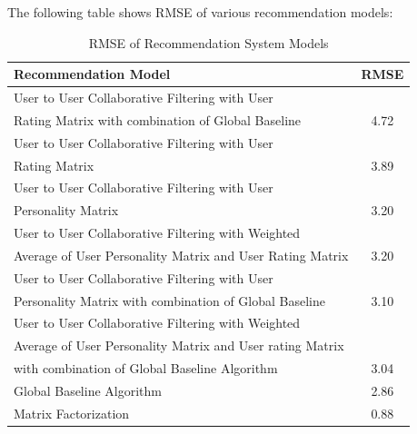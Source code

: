 \documentclass[conference]{IEEEtran}
\begin{document}
The following table shows RMSE of various recommendation models:\\
\FloatBarrier
  \begin{table}[H]
    \centering
        \caption{RMSE of Recommendation System Models}

    \begin{tabular}{| l | c |}
      \hline
      {\bf Recommendation Model} & {\bf RMSE}\\
      \hline
      User to User Collaborative Filtering with User & \\ Rating Matrix with combination of Global Baseline & 4.72\\
      \hline
      User to User Collaborative Filtering with User & \\ Rating Matrix & 3.89\\
      \hline
      User to User Collaborative Filtering with User & \\ Personality Matrix & 3.20\\
      \hline
      User to User Collaborative Filtering with Weighted & \\ Average of User Personality Matrix and User Rating Matrix & 3.20\\
      \hline
      User to User Collaborative Filtering with User & \\ Personality Matrix with combination of Global Baseline & 3.10\\
      \hline
      User to User Collaborative Filtering with Weighted & \\ Average of User Personality Matrix and User rating Matrix & \\ with combination of Global Baseline Algorithm & 3.04\\
      \hline
      Global Baseline Algorithm & 2.86\\
      \hline
      Matrix Factorization & 0.88\\
      \hline
    \end{tabular}
  \end{table}
\end{document}
